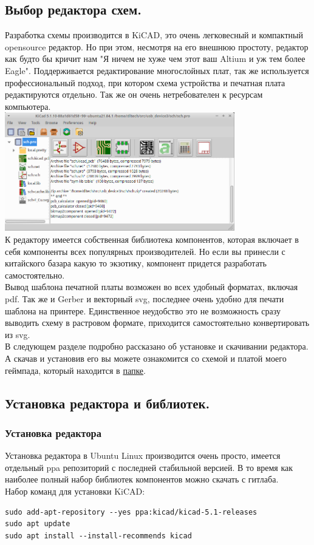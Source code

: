 \documentclass[12pt,a4paper]{article}
\begin{document}
\subsection{Выбор редактора схем.}
    Разработка схемы производится в KiCAD, это очень легковесный и компактный
    opensource редактор. Но при этом, несмотря на его внешнюю простоту, редактор
    как будто бы кричит нам "Я ничем не хуже чем этот ваш Altium и уж тем более
    Eagle". Поддерживается редактирование многослойных плат, так же используется
    профессиональный подход, при котором схема устройства и печатная плата
    редактируются отдельно. Так же он очень нетребователен к ресурсам
    компьютера.\\
\includegraphics[width=10cm]{kicad1.png}\\
    К редактору имеется собственная библиотека компонентов, которая включает в
    себя компоненты всех популярных производителей. Но если вы принесли
    с китайского базара какую то экзотику, компонент придется разработать
    самостоятельно.\\
    Вывод шаблона печатной платы возможен во всех удобный форматах, включая pdf.
    Так же и Gerber и векторный svg, последнее очень удобно для печати шаблона
    на принтере. Единственное неудобство это не возможность сразу выводить схему
    в растровом формате, приходится самостоятельно конвертировать из svg.\\
    В следующем разделе подробно рассказано об установке и скачивании редактора.
    А скачав и установив его вы можете ознакомится со схемой и платой моего
    геймпада, который находится в
    \href{https://github.com/dltech/usb_device3/tree/main/sch}{папке}.

\subsection{Установка редактора и библиотек.}
\subsubsection{Установка редактора}
    Установка редактора в Ubuntu Linux производится очень просто, имеется
    отдельный ppa репозиторий с последней стабильной версией. В то время как
    наиболее полный набор библиотек компонентов можно скачать с гитлаба.\\
    Набор команд для установки KiCAD:
\lstset{language=bash}           %
\begin{lstlisting}
sudo add-apt-repository --yes ppa:kicad/kicad-5.1-releases
sudo apt update
sudo apt install --install-recommends kicad
\end{lstlisting}
\end{document}
